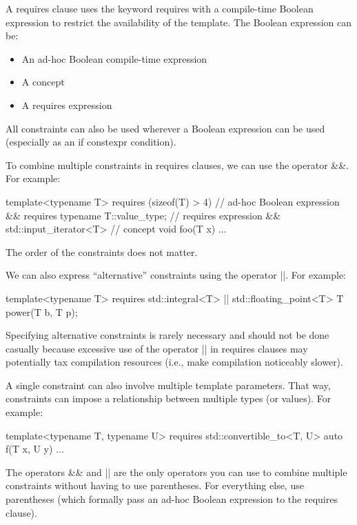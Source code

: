 A requires clause uses the keyword requires with a compile-time Boolean expression to restrict the availability of the template. The Boolean expression can be:

\begin{itemize}
\item
An ad-hoc Boolean compile-time expression

\item
A concept

\item
A requires expression
\end{itemize}

All constraints can also be used wherever a Boolean expression can be used (especially as an if constexpr condition).



To combine multiple constraints in requires clauses, we can use the operator \&\&. For example:

\begin{cpp}
template<typename T>
requires (sizeof(T) > 4) // ad-hoc Boolean expression
			&& requires { typename T::value_type; } // requires expression
			&& std::input_iterator<T> // concept
void foo(T x) {
	...
}
\end{cpp}

The order of the constraints does not matter.

We can also express “alternative” constraints using the operator ||. For example:

\begin{cpp}
template<typename T>
requires std::integral<T> || std::floating_point<T>
T power(T b, T p);
\end{cpp}

Specifying alternative constraints is rarely necessary and should not be done casually because excessive use of the operator || in requires clauses may potentially tax compilation resources (i.e., make compilation noticeably slower).

A single constraint can also involve multiple template parameters. That way, constraints can impose a relationship between multiple types (or values). For example:

\begin{cpp}
template<typename T, typename U>
requires std::convertible_to<T, U>
auto f(T x, U y) {
	...
}
\end{cpp}

The operators \&\& and || are the only operators you can use to combine multiple constraints without having to use parentheses. For everything else, use parentheses (which formally pass an ad-hoc Boolean expression to the requires clause).






























